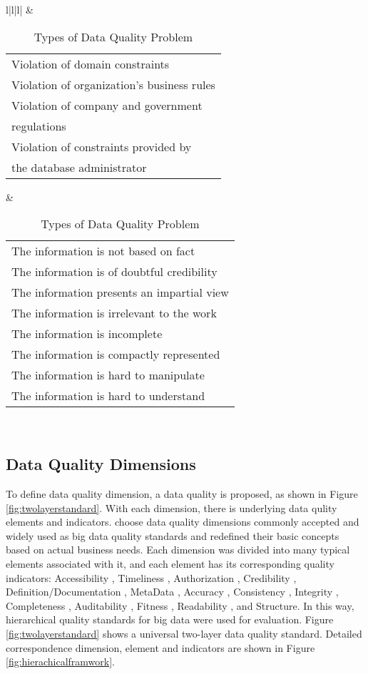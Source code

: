 \documentclass[pdftex,english,oribibl]{llncs}
\begin{document}
\begin{table}[]
\begin{tabular}{l|l|l|}
   & \begin{tabular}[c]{@{}l@{}}Violation of domain constraints \\ Violation of organization's business rules\\ Violation of company and government\\ regulations \\ Violation of constraints provided by\\  the database administrator\end{tabular}                              & \begin{tabular}[c]{@{}l@{}}The information is not based on fact \\ The information is of doubtful credibility\\ The information presents an impartial view\\ The information is irrelevant to the work\\ The information is incomplete\\ The information is compactly represented\\ The information is hard to manipulate \\ The information is hard to understand\end{tabular} \\ \hline
\end{tabular}
\caption{Types of Data Quality Problem \cite{Borek2011AClassficationOfDataQualityAssessmentMethod}}
\label{table:DataQualityProblem}
\end{table}


\subsection{Data Quality Dimensions}\label{sec:DataQualityDimensions}

To define data quality dimension, a data quality is proposed, as shown in Figure \ref{fig:twolayerstandard}. With each dimension, there is underlying data qulity elements and indicators.
\citet{Cai2005ChallnegesOfDataQuality} choose data quality dimensions commonly accepted and widely used as big data quality standards and redefined their basic concepts based on actual business needs.
Each dimension was divided into many typical elements associated with it, and each element has its corresponding quality indicators: Accessibility
, Timeliness
, Authorization
, Credibility
, Definition/Documentation
, MetaData
, Accuracy
, Consistency
, Integrity
, Completeness
, Auditability
, Fitness
, Readability
, and Structure.
In this way, hierarchical quality standards for big data were used for evaluation.
Figure \ref{fig:twolayerstandard} shows a universal two-layer data quality standard. Detailed correspondence dimension, element and indicators are shown in Figure \ref{fig:hierachicalframwork}.
\end{document}
